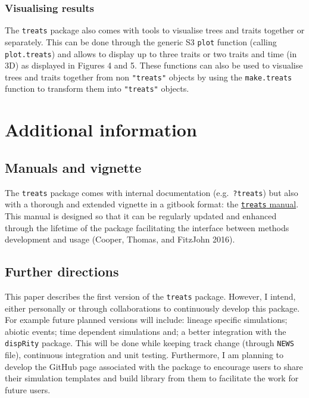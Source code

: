 \documentclass[
]{article}
\begin{document}
\hypertarget{visualising-results}{%
\subsubsection{Visualising results}\label{visualising-results}}

The \texttt{treats} package also comes with tools to visualise trees and
traits together or separately. This can be done through the generic S3
\texttt{plot} function (calling \texttt{plot.treats}) and allows to
display up to three traits or two traits and time (in 3D) as displayed
in Figures 4 and 5. These functions can also be used to visualise trees
and traits together from non \texttt{"treats"} objects by using the
\texttt{make.treats} function to transform them into \texttt{"treats"}
objects.

\hypertarget{additional-information}{%
\section{Additional information}\label{additional-information}}

\hypertarget{manuals-and-vignette}{%
\subsection{Manuals and vignette}\label{manuals-and-vignette}}

The \texttt{treats} package comes with internal documentation
(e.g.~\texttt{?treats}) but also with a thorough and extended vignette
in a gitbook format: the
\href{http://tguillerme.github.io/treats.html}{\texttt{treats} manual}.
This manual is designed so that it can be regularly updated and enhanced
through the lifetime of the package facilitating the interface between
methods development and usage (Cooper, Thomas, and FitzJohn 2016).

\hypertarget{further-directions}{%
\subsection{Further directions}\label{further-directions}}

This paper describes the first version of the \texttt{treats} package.
However, I intend, either personally or through collaborations to
continuously develop this package. For example future planned versions
will include: lineage specific simulations; abiotic events; time
dependent simulations and; a better integration with the
\texttt{dispRity} package. This will be done while keeping track change
(through \texttt{NEWS} file), continuous integration and unit testing.
Furthermore, I am planning to develop the GitHub page associated with
the package to encourage users to share their simulation templates and
build library from them to facilitate the work for future users.
\end{document}
